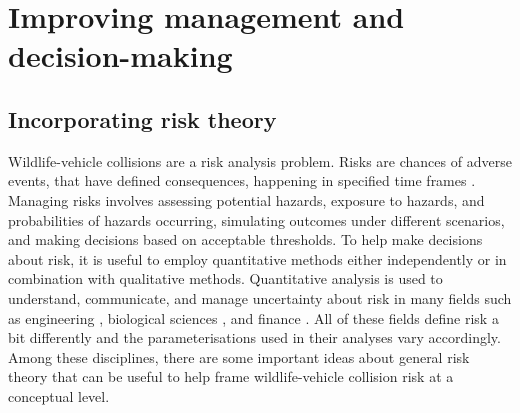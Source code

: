 

\section{Improving management and decision-making}

\subsection{Incorporating risk theory}

Wildlife-vehicle collisions are a risk analysis problem. Risks are chances of adverse events, that have defined consequences, happening in specified time frames \citep{burg05}. Managing risks involves assessing potential hazards, exposure to hazards, and probabilities of hazards occurring, simulating outcomes under different scenarios, and making decisions based on acceptable thresholds. To help make decisions about risk, it is useful to employ quantitative methods either independently or in combination with qualitative methods. Quantitative analysis is used to understand, communicate, and manage uncertainty about risk in many fields such as engineering \citep{apos04}, biological sciences \citep{sute16}, and finance \citep{mcne15}.  All of these fields define risk a bit differently and the parameterisations used in their analyses vary accordingly. Among these disciplines, there are some important ideas about general risk theory that can be useful to help frame wildlife-vehicle collision risk at a conceptual level.

